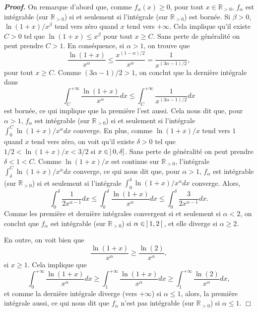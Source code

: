 \documentclass[11pt,a4paper]{article}
\newcommand{\RR}{\mathbb{R}}
\newenvironment{preuve}[1][]
{\vskip 2mm  \noindent\emph{\bf Proof#1. }}{$\Box$ \vskip 2mm}
\let\geq\geqslant
\let\leq\leqslant
\begin{document}
	\begin{preuve}
		On remarque d'abord que, comme $f_{\alpha}(x) \geq 0$, pour tout $ x \in \RR_{> 0}$, $f_{\alpha}$ est intégrable (sur $\RR_{> 0}$) si et seulement si l'intégrale (sur $\RR_{> 0}$) est bornée. 
		Si $\beta >0$, $\ln (1+x)/x^{\beta}$ tend vers zéro quand $x$ tend vers $+ \infty$. 
		Cela implique qu'il existe $C > 0$ tel que $\ln (1+x) \leq x^{\beta}$ pour tout $x \geq C$. 
		Sans perte de généralité on peut prendre $C > 1$. 
		En conséquence, si $\alpha > 1$, on trouve que 
		\[     \frac{\ln (1+x)}{x^{\alpha}} \leq \frac{x^{(1 - \alpha)/2}}{x^{\alpha}} = \frac{1}{x^{(3 \alpha -1) / 2}},     \]
		pour tout $x \geq C$. 
		Comme $(3 \alpha -1) / 2  > 1$, on conclut que la dernière intégrale dans
		\[     \int_{C}^{+\infty} \frac{\ln (1+x)}{x^{\alpha}} dx \leq \int_{C}^{+\infty} \frac{1}{x^{(3 \alpha -1) / 2}} dx    \]
		est bornée, ce qui implique que la première l'est aussi. 
		Cela nous dit que, pour $\alpha > 1$, $f_{\alpha}$ est intégrable (sur $\RR_{> 0}$) si et seulement si l'intégrale 
		$\int_{0}^{C} \ln(1+x)/x^{\alpha} dx$ converge. 
		En plus, comme $\ln(1+x)/x$ tend vers $1$ quand $x$ tend vers zéro, on voit qu'il existe $\delta > 0$ tel que 
		$1/2 < \ln(1+x)/x < 3/2$ si $x \in \hskip 0.6mm ] \hskip 0.6mm 0 , \delta]$. 
		Sans perte de généralité on peut prendre $\delta < 1 < C$. 
		Comme $\ln(1+x)/x$ est continue sur $\RR_{> 0}$, l'intégrale $\int_{\delta}^{C} \ln (1+x)/x^{\alpha} dx$ converge, ce qui nous dit que, 
		pour $\alpha > 1$,  $f_{\alpha}$ est intégrable (sur $\RR_{> 0}$) si et seulement si l'intégrale 
		$\int_{0}^{\delta} \ln (1+x)/x^{\alpha} dx$ converge. 
		Alors,  
		\[     \int_{0}^{\delta} \frac{1}{2 x^{\alpha -1}} dx \leq \int_{0}^{\delta} \frac{\ln (1+x)}{x^{\alpha}} dx \leq \int_{0}^{\delta} \frac{3}{2 x^{\alpha -1}} dx.     \]
		Comme les première et dernière intégrales convergent si et seulement si $\alpha < 2$, on conclut que 
		$f_{\alpha}$ est intégrable (sur $\RR_{> 0}$) si $\alpha \in \hskip 0.6mm ] \hskip 0.6mm 1 ,  2 \hskip 0.6mm [ \hskip 0.6mm$, 
		et elle diverge si $\alpha \geq 2$. 
		
		En outre, on voit bien que 
		\[     \frac{\ln (1+x)}{x^{\alpha}} \geq \frac{\ln(2)}{x^{\alpha}},     \]
		si $x \geq 1$. 
		Cela implique que 
		\[     \int_{0}^{+\infty}  \frac{\ln (1+x)}{x^{\alpha}} dx \geq \int_{1}^{+\infty}  \frac{\ln (1+x)}{x^{\alpha}} dx \geq \int_{1}^{+\infty} \frac{\ln(2)}{x^{\alpha}} dx,     \]
		et comme la dernière intégrale diverge (vers $+ \infty$) si $\alpha \leq 1$, alors, la première intégrale aussi, ce qui nous dit que 
		$f_{\alpha}$ n'est pas intégrable (sur $\RR_{> 0}$) si $\alpha \leq 1$. 
	\end{preuve}
	
\end{document}
